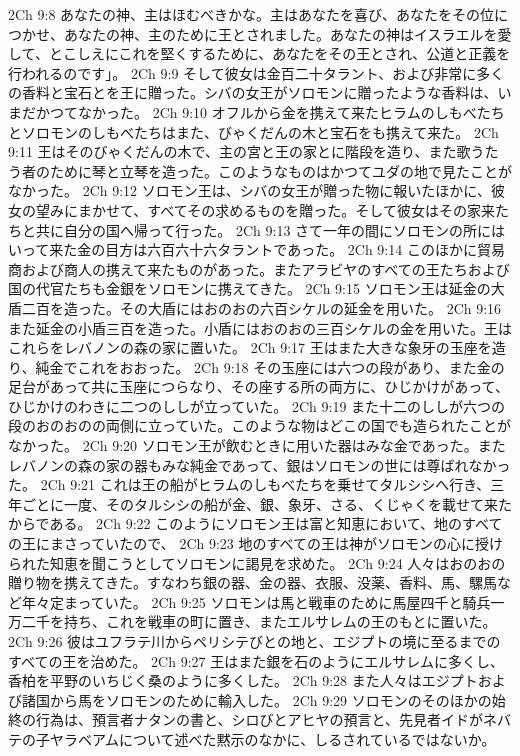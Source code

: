 2Ch 9:8  あなたの神、主はほむべきかな。主はあなたを喜び、あなたをその位につかせ、あなたの神、主のために王とされました。あなたの神はイスラエルを愛して、とこしえにこれを堅くするために、あなたをその王とされ、公道と正義を行われるのです」。
2Ch 9:9  そして彼女は金百二十タラント、および非常に多くの香料と宝石とを王に贈った。シバの女王がソロモンに贈ったような香料は、いまだかつてなかった。
2Ch 9:10  オフルから金を携えて来たヒラムのしもべたちとソロモンのしもべたちはまた、びゃくだんの木と宝石をも携えて来た。
2Ch 9:11  王はそのびゃくだんの木で、主の宮と王の家とに階段を造り、また歌うたう者のために琴と立琴を造った。このようなものはかつてユダの地で見たことがなかった。
2Ch 9:12  ソロモン王は、シバの女王が贈った物に報いたほかに、彼女の望みにまかせて、すべてその求めるものを贈った。そして彼女はその家来たちと共に自分の国へ帰って行った。
2Ch 9:13  さて一年の間にソロモンの所にはいって来た金の目方は六百六十六タラントであった。
2Ch 9:14  このほかに貿易商および商人の携えて来たものがあった。またアラビヤのすべての王たちおよび国の代官たちも金銀をソロモンに携えてきた。
2Ch 9:15  ソロモン王は延金の大盾二百を造った。その大盾にはおのおの六百シケルの延金を用いた。
2Ch 9:16  また延金の小盾三百を造った。小盾にはおのおの三百シケルの金を用いた。王はこれらをレバノンの森の家に置いた。
2Ch 9:17  王はまた大きな象牙の玉座を造り、純金でこれをおおった。
2Ch 9:18  その玉座には六つの段があり、また金の足台があって共に玉座につらなり、その座する所の両方に、ひじかけがあって、ひじかけのわきに二つのししが立っていた。
2Ch 9:19  また十二のししが六つの段のおのおのの両側に立っていた。このような物はどこの国でも造られたことがなかった。
2Ch 9:20  ソロモン王が飲むときに用いた器はみな金であった。またレバノンの森の家の器もみな純金であって、銀はソロモンの世には尊ばれなかった。
2Ch 9:21  これは王の船がヒラムのしもべたちを乗せてタルシシへ行き、三年ごとに一度、そのタルシシの船が金、銀、象牙、さる、くじゃくを載せて来たからである。
2Ch 9:22  このようにソロモン王は富と知恵において、地のすべての王にまさっていたので、
2Ch 9:23  地のすべての王は神がソロモンの心に授けられた知恵を聞こうとしてソロモンに謁見を求めた。
2Ch 9:24  人々はおのおの贈り物を携えてきた。すなわち銀の器、金の器、衣服、没薬、香料、馬、騾馬など年々定まっていた。
2Ch 9:25  ソロモンは馬と戦車のために馬屋四千と騎兵一万二千を持ち、これを戦車の町に置き、またエルサレムの王のもとに置いた。
2Ch 9:26  彼はユフラテ川からペリシテびとの地と、エジプトの境に至るまでのすべての王を治めた。
2Ch 9:27  王はまた銀を石のようにエルサレムに多くし、香柏を平野のいちじく桑のように多くした。
2Ch 9:28  また人々はエジプトおよび諸国から馬をソロモンのために輸入した。
2Ch 9:29  ソロモンのそのほかの始終の行為は、預言者ナタンの書と、シロびとアヒヤの預言と、先見者イドがネバテの子ヤラベアムについて述べた黙示のなかに、しるされているではないか。
